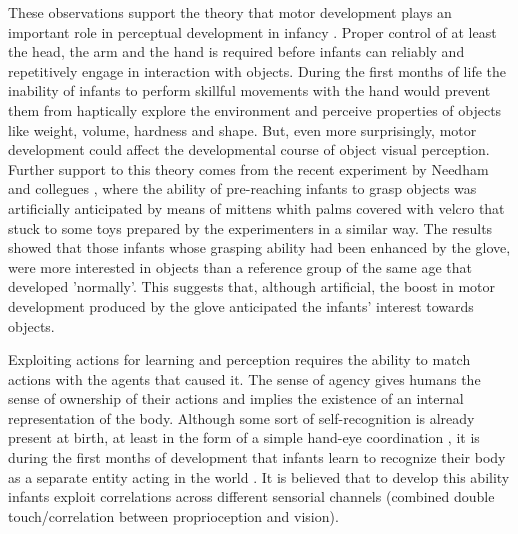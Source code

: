 These observations support the theory that motor development plays an important role in perceptual development in infancy \cite{bushnell93motor}. Proper control of at least the head, the arm and the hand is required before infants can reliably and repetitively engage in interaction with objects. During the first months of life the inability of infants to perform skillful movements with the hand would prevent them from haptically explore the environment and perceive properties of objects like weight, volume, hardness and shape. But, even more surprisingly, motor development could affect the developmental course of object visual perception.
Further support to this theory comes from the recent experiment by Needham and collegues \cite{Needham02apick-me-up}, where the ability of pre-reaching infants to grasp objects was artificially anticipated by means of mittens whith palms covered with velcro that stuck to some toys prepared by the experimenters in a similar way. The results showed that those infants whose grasping ability had been enhanced by the glove, were more interested in objects than a reference group of the same age that developed 'normally'. This suggests that, although artificial, the boost in motor development produced by the glove anticipated the infants' interest towards objects.

Exploiting actions for learning and perception requires the ability to match actions with the agents that caused it. The sense of agency \cite{jeannerod02mechanism} gives humans the sense of ownership of their actions and implies the existence of an internal representation of the body. Although some sort of self-recognition is already present at birth, at least in the form of a simple hand-eye coordination \cite{meer95thefunctional}, it is during the first months of development that infants learn to recognize their body as a separate entity acting in the world \cite{rochat00perceived}. It is believed that to develop this ability infants exploit correlations across different sensorial channels (combined double touch/correlation between proprioception and vision). %

